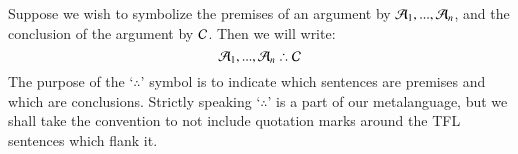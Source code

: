 \begin{definition}
    Suppose we wish to symbolize the premises of an argument by $\mathcal{A}_1,...,\mathcal{A}_n$, and the conclusion of the argument by $\mathcal{C}$. Then we will write:\begin{equation}
        \metav{A}_1,...,\metav{A}_n \therefore \metav{C}
    \end{equation}
    The purpose of the `$\therefore$' symbol is to indicate which sentences are premises and which are conclusions. Strictly speaking `$\therefore$' is a part of our metalanguage, but we shall take the convention to not include quotation marks around the TFL sentences which flank it.
\end{definition}



